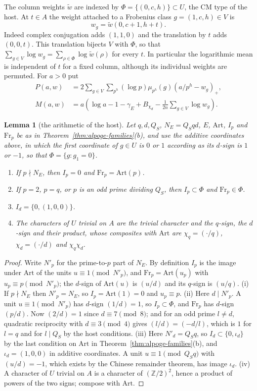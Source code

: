 \documentclass[10pt]{amsart}
\newtheorem{lemma}[theorem]{Lemma}
\theoremstyle{definition}
\theoremstyle{remark}
\newcommand{\Z}{\mathbb Z}
\begin{document}
The column weights $\widetilde w$ are indexed by
$\Phi=\{(0,c,h)\}\subset U$, the CM type of the host. At $t\in A$ the weight attached
to a Frobenius class $g=(1,c,h)\in V$ is
\[
 w_g=\widetilde w(0,c+1,h+t).
\]
Indeed complex conjugation adds $(1,1,0)$ and the translation by $t$ adds
$(0,0,t)$. This translation bijects $V$ with $\Phi$, so that
$\sum_{g\in V}\log w_g=\sum_{\rho\in\Phi}\log\widetilde w(\rho)$ for every
$t$. In particular the logarithmic mean is independent of $t$ for
a fixed column, although its individual weights are permuted.
For $a>0$ put
\[
 \begin{aligned}
 P(a,w)&=2\sum_{g\in V}\sum_{p^h}(\log p)\mu_{p^h}(g)
                        (a/p^h-w_g)_+,\\
 M(a,w)&=a\left(\log a-1-\gamma_E+B_{\chi_d}
                   -\frac1{2n}\sum_{g\in V}\log w_g\right).
 \end{aligned}
\]
\begin{lemma}[the arithmetic of the host]\label{lem:host-facts}
Let $q,d,Q_S$, $N_E=Q_Sqd$, $E$, $\mathrm{Art}$, $I_p$ and $\mathrm{Fr}_p$ be
as in Theorem~\ref{thm:alpoge-families}(b), and use the additive
coordinates above, in which the first coordinate of $g\in U$ is $0$ or $1$
according as its $d$-sign is $1$ or $-1$, so that
$\Phi=\{g:g_1=0\}$.
\begin{enumerate}
\item[(i)] If $p\nmid N_E$, then $I_p=0$ and $\mathrm{Fr}_p=\mathrm{Art}(p)$.
\item[(ii)] If $p=2$, $p=q$, or $p$ is an odd prime dividing $Q_S$, then
$I_p\subset\Phi$ and $\mathrm{Fr}_p\in\Phi$.
\item[(iii)] $I_d=\{0,(1,0,0)\}$.
\item[(iv)] The characters of $U$ trivial on $A$ are the trivial character
and the $q$-sign, the $d$-sign and their product, whose composites with
$\mathrm{Art}$ are $\chi_q=(\cdot/q)$, $\chi_d=(\cdot/d)$ and $\chi_q\chi_d$.
\end{enumerate}
\end{lemma}
\begin{proof}
Write $N'_p$ for the prime-to-$p$ part of $N_E$. By definition $I_p$ is
the image under $\mathrm{Art}$ of the units $u\equiv1\pmod{N'_p}$, and
$\mathrm{Fr}_p=\mathrm{Art}(u_p)$ with $u_p\equiv p\pmod{N'_p}$; the $d$-sign
of $\mathrm{Art}(u)$ is $(u/d)$ and its $q$-sign is $(u/q)$. (i) If
$p\nmid N_E$ then $N'_p=N_E$, so $I_p=\mathrm{Art}(1)=0$ and $u_p\equiv p$.
(ii) Here $d\mid N'_p$. A unit $u\equiv1\pmod{N'_p}$ has $d$-sign
$(1/d)=1$, so $I_p\subset\Phi$, and $\mathrm{Fr}_p$ has $d$-sign $(p/d)$.
Now $(2/d)=1$ since $d\equiv7\pmod8$; and for an odd prime $l\ne d$,
quadratic reciprocity with $d\equiv3\pmod4$ gives $(l/d)=(-d/l)$, which is
$1$ for $l=q$ and for $l\mid Q_S$ by the host conditions. (iii) Here
$N'_d=Q_Sq$, so $I_d\subset\{0,\iota_d\}$ by the last condition on
$\mathrm{Art}$ in Theorem~\ref{thm:alpoge-families}(b), and $\iota_d=(1,0,0)$ in additive
coordinates. A unit $u\equiv1\pmod{Q_Sq}$ with $(u/d)=-1$, which exists by
the Chinese remainder theorem, has image $\iota_d$. (iv) A character of $U$
trivial on $A$ is a character of $(\Z/2)^2$, hence a product of powers of
the two signs; compose with $\mathrm{Art}$.
\end{proof}
\end{document}
